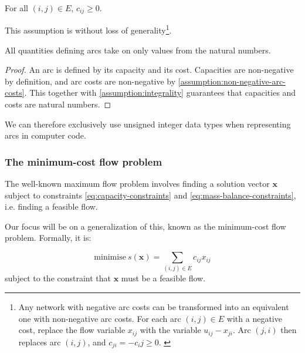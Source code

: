 \begin{assumption} \label{assumption:non-negative-arc-costs}
For all $(i,j) \in E$, $c_{ij} \geq 0$. \\
\end{assumption}

\begin{remark} 
This assumption is without loss of generality\footnote{Any network with negative arc costs can be transformed into an equivalent one with non-negative arc costs. For each arc $(i,j) \in E$ with a negative cost, replace the flow variable $x_{ij}$ with the variable $u_{ij} - x_{ji}$. Arc $(j,i)$ then replaces arc $(i,j)$, and $c_{ji} = -c_ij \geq 0$. \cite[p.~48]{Ahuja:1993}}. \\
\end{remark}

\begin{cor}All quantities defining arcs take on only values from the natural numbers.\footnotemark {}
\end{cor}
\begin{proof}
An arc is defined by its capacity and its cost. Capacities are non-negative by definition, and arc costs are non-negative by \cref{assumption:non-negative-arc-costs}. This together with \cref{assumption:integrality} guarantees that capacities and costs are natural numbers.
\end{proof}

\begin{remark}  
We can therefore exclusively use unsigned integer data types when representing arcs in computer code.
\end{remark}

\subsubsection{The minimum-cost flow problem} \label{sec:prep-flow-mcf}

The well-known maximum flow problem involves finding a solution vector
$\mathbf{x}$ subject to constraints \cref{eq:capacity-constraints} and \cref{eq:mass-balance-constraints}, i.e. finding a feasible flow.

Our focus will be on a generalization of this, known as the minimum-cost flow problem. Formally, it is:

\begin{equation} \label{eq:mcf-primal-problem}
\mbox{minimise}\ s(\mathbf{x})=\sum_{(i,j)\in E}c_{ij}x_{ij}
\end{equation}
subject to the constraint that $\mathbf{x}$ must be a feasible flow.

